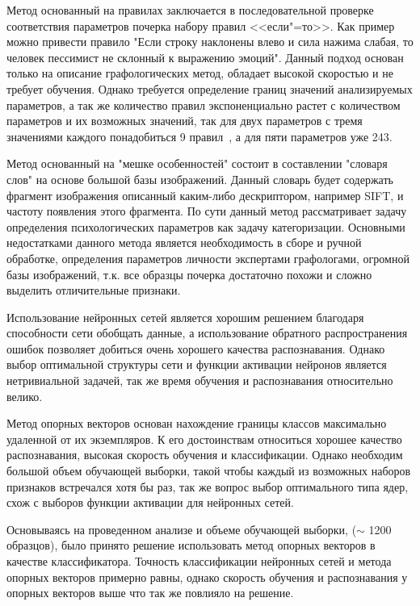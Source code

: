Метод основанный на правилах заключается в последовательной проверке соответствия параметров почерка набору правил <<если"=то>>. Как пример можно привести правило "Если строку наклонены влево и сила нажима слабая, то человек пессимист не склонный к выражению эмоций". Данный подход основан только на описание графологических метод, обладает высокой скоростью и не требует обучения. Однако требуется определение границ значений анализируемых параметров, а так же количество правил экспоненциально растет с количеством параметров и их возможных значений, так для двух параметров с тремя значениями каждого понадобиться 9 правил~\cite{champa_ananda_kumar_rule_base}, а для пяти параметров уже 243.

Метод основанный на "мешке особенностей" состоит в составлении "словаря слов" на основе большой базы изображений. Данный словарь будет содержать фрагмент изображения описанный каким-либо дескриптором, например SIFT, и частоту появления этого фрагмента. По сути данный метод рассматривает задачу определения психологических параметров как задачу категоризации. Основными недостатками данного метода является необходимость в сборе и ручной обработке, определения параметров личности экспертами графологами, огромной базы изображений, т.к. все образцы почерка достаточно похожи и сложно выделить отличительные признаки.

Использование нейронных сетей является хорошим решением благодаря способности сети обобщать данные, а использование обратного распространения ошибок позволяет добиться очень хорошего качества распознавания. Однако выбор оптимальной структуры сети и функции активации нейронов является нетривиальной задачей, так же время обучения и распознавания относительно велико.

Метод опорных векторов основан нахождение границы классов максимально удаленной от их экземпляров. К его достоинствам относиться хорошее качество распознавания, высокая скорость обучения и классификации. Однако необходим большой объем обучающей выборки, такой чтобы каждый из возможных наборов признаков встречался хотя бы раз, так же вопрос выбор оптимального типа ядер, схож с выборов функции активации для нейронных сетей.

Основываясь на проведенном анализе и объеме обучающей выборки, ($\sim$ 1200 образцов), было принято решение использовать метод опорных векторов в качестве классификатора. Точность классификации нейронных сетей и метода опорных векторов примерно равны, однако скорость обучения и распознавания у опорных векторов выше что так же повлияло на решение.

